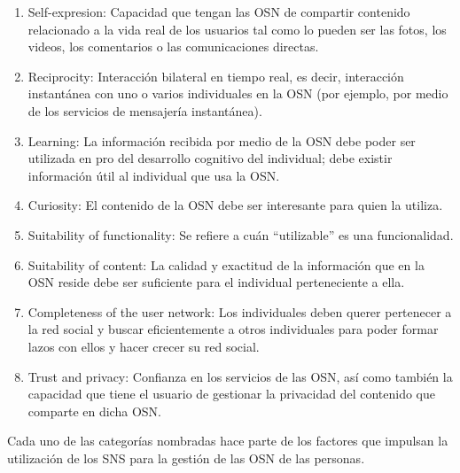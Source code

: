 \begin{enumerate}
  \item Self-expresion: Capacidad que tengan las OSN de compartir contenido relacionado a la vida real de los usuarios tal como lo pueden ser las fotos, los videos, los comentarios o las comunicaciones directas.
  \item Reciprocity: Interacción bilateral en tiempo real, es decir, interacción instantánea con uno o varios individuales en la OSN (por ejemplo, por medio de los servicios de mensajería instantánea).
  \item Learning: La información recibida por medio de la OSN debe poder ser utilizada en pro del desarrollo cognitivo del individual; debe existir información útil al individual que usa la OSN.
  \item Curiosity: El contenido de la OSN debe ser interesante para quien la utiliza.
  \item Suitability of functionality: Se refiere a cuán ``utilizable'' es una funcionalidad.
  \item Suitability of content: La calidad y exactitud de la información que en la OSN reside debe ser suficiente para el individual perteneciente a ella.
  \item Completeness of the user network: Los individuales deben querer pertenecer a la red social y buscar eficientemente a otros individuales para poder formar lazos con ellos y hacer crecer su red social.
  \item Trust and privacy: Confianza en los servicios de las OSN, así como también la capacidad que tiene el usuario de gestionar la privacidad del contenido que comparte en dicha OSN. \cite{social_experience}
\end{enumerate}

Cada uno de las categorías nombradas hace parte de los factores que impulsan la utilización de los SNS para la gestión de las OSN de las personas.
